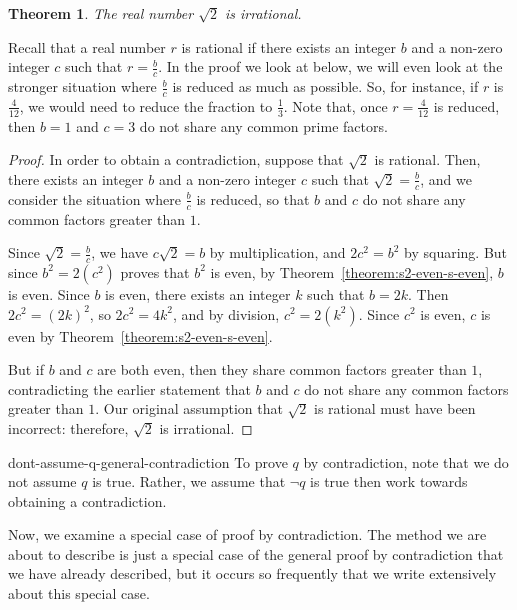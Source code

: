 \documentclass{book}
\newcounter{ekcounter}%
\theoremstyle{ekimcustom}
\newtheorem{theorem}[ekcounter]{Theorem}
\begin{document}
\begin{theorem}
The real number $\sqrt{2}$ is irrational.
\end{theorem}
Recall that a real number $r$ is rational if there exists an integer $b$ and a non-zero integer $c$ such that $r = \frac{b}{c}$. In the proof we look at below, we will even look at the stronger situation where $\frac{b}{c}$ is reduced as much as possible. So, for instance, if $r$ is $\frac{4}{12}$, we would need to reduce the fraction to $\frac13$. Note that, once $r=\frac{4}{12}$ is reduced, then $b=1$ and $c=3$ do not share any common prime factors.
\begin{proof}
In order to obtain a contradiction, suppose that $\sqrt{2}$ is rational. Then, there exists an integer $b$ and a non-zero integer $c$ such that $\sqrt{2} = \frac{b}{c}$, and we consider the situation where $\frac{b}{c}$ is reduced, so that $b$ and $c$ do not share any common factors greater than $1$.

Since $\sqrt{2} = \frac{b}{c}$, we have $c\sqrt{2}=b$ by multiplication, and $2c^2=b^2$ by squaring. But since $b^2=2(c^2)$ proves that $b^2$ is even, by  Theorem~\ref{theorem:s2-even-s-even}, $b$ is even. Since $b$ is even, there exists an integer $k$ such that $b=2k$. Then $2c^2=(2k)^2$, so $2c^2=4k^2$, and by division, $c^2=2(k^2)$. Since $c^2$ is even, $c$ is even by Theorem~\ref{theorem:s2-even-s-even}.

But if $b$ and $c$ are both even, then they share common factors greater than $1$, contradicting the earlier statement that $b$ and $c$ do not share any common factors greater than $1$. Our original assumption that $\sqrt{2}$ is rational must have been incorrect: therefore, $\sqrt{2}$ is irrational.
\end{proof}
\begin{bwarning}{}{dont-assume-q-general-contradiction}
To prove $q$ by contradiction, note that we do not assume $q$ is true. Rather, we assume that $\neg q$ is true then work towards obtaining a contradiction.
\end{bwarning}

Now, we examine a special case of proof by contradiction. The method we are about to describe is just a special case of the general proof by contradiction that we have already described, but it occurs so frequently that we write extensively about this special case.
\end{document}
